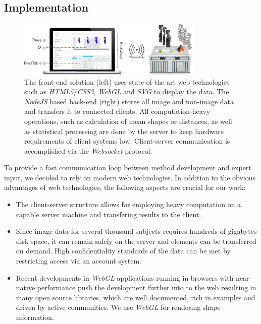 \documentclass[journal]{style/vgtc} 			          %
\begin{document}
\subsection{Implementation}
\begin{figure}[htb]
 \centering
 \label{fig:technologies}
 \includegraphics[width=3.5in]{figures/technologies}
 \caption{The front-end solution (left) uses state-of-the-art web technologies such as \emph{HTML5}/\emph{CSS3}, \emph{WebGL} and \emph{SVG} to display the data.
 The \emph{NodeJS} based back-end (right) stores all image and non-image data and transfers it to connected clients.
 All computation-heavy operations, such as calculation of mean shapes or distances, as well as statistical processing are done by the server to keep hardware requirements of client systems low. 
 Client-server communication is accomplished via the \emph{Websocket} protocol.
 }
\end{figure}
%
To provide a fast communication loop between method development and expert input, we decided to rely on modern web technologies.
%
In addition to the obvious advantages of web technologies, the following aspects are crucial for our work:
\begin{itemize}
	\item The client-server structure allows for employing heavy computation on a capable server machine and transfering results to the client.
	\item Since image data for several thousand subjects requires hundreds of gigabytes disk space, it can remain safely on the server and elements can be transferred on demand.
	High confidentiality standards of the data can be met by restricting access via an account system.
	\item Recent developments in \emph{WebGL} applications running in browsers with near-native performance push the development further into to the web resulting in many open source libraries, which are well documented, rich in examples and driven by active communities. We use \emph{WebGL} for rendering shape information.
\end{itemize}
\end{document}
